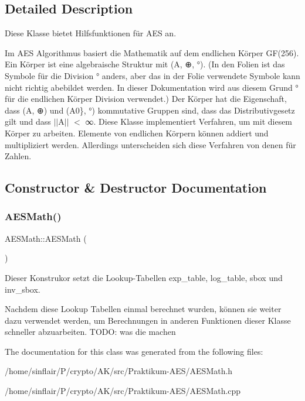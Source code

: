 \subsection{Detailed Description}
Diese Klasse bietet Hilfsfunktionen für A\+ES an.

Im A\+ES Algorithmus basiert die Mathematik auf dem endlichen Körper G\+F(256). Ein Körper ist eine algebraische Struktur mit (A, \textquotesingle{}⊕\textquotesingle{}, \textquotesingle{}°\textquotesingle{}). (In den Folien ist das Symbole für die Division ° anders, aber das in der Folie verwendete Symbole kann nicht richtig abebildet werden. In dieser Dokumentation wird aus diesem Grund ° für die endlichen Körper Division verwendet.) Der Körper hat die Eigenschaft, dass (A, ⊕) und (A0\}, °) kommutative Gruppen sind, dass das Distributivgesetz gilt und dass $\vert$$\vert$\+A$\vert$$\vert$ $<$ ∞. Diese Klasse implementiert Verfahren, um mit diesem Körper zu arbeiten. Elemente von endlichen Körpern können addiert und multipliziert werden. Allerdings unterscheiden sich diese Verfahren von denen für Zahlen. 

\subsection{Constructor \& Destructor Documentation}
\mbox{\label{classAESMath_a09bba3b08a03d0bd2abf1d20473bc895}} 
\subsubsection{\texorpdfstring{A\+E\+S\+Math()}{AESMath()}}
{\footnotesize\ttfamily A\+E\+S\+Math\+::\+A\+E\+S\+Math (\begin{DoxyParamCaption}{ }\end{DoxyParamCaption})}

Dieser Konstrukor setzt die Lookup-\/\+Tabellen exp\+\_\+table, log\+\_\+table, sbox und inv\+\_\+sbox.

Nachdem diese Lookup Tabellen einmal berechnet wurden, können sie weiter dazu verwendet werden, um Berechnungen in anderen Funktionen dieser Klasse schneller abzuarbeiten. T\+O\+DO\+: was die machen 

The documentation for this class was generated from the following files\+:\begin{DoxyCompactItemize}
\item 
/home/sinflair/\+P/crypto/\+A\+K/src/\+Praktikum-\/\+A\+E\+S/A\+E\+S\+Math.\+h\item 
/home/sinflair/\+P/crypto/\+A\+K/src/\+Praktikum-\/\+A\+E\+S/A\+E\+S\+Math.\+cpp\end{DoxyCompactItemize}
